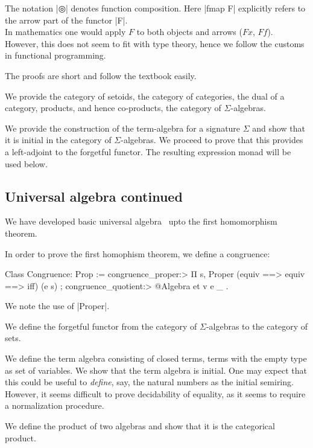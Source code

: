 \documentclass[a4paper,10pt, runningheads]{llncs}
\begin{document}
The notation |◎| denotes function composition.
Here |fmap F| explicitly refers to the arrow part of the functor |F|.\\
In mathematics one would apply $F$ to both objects and arrows ($F x$, $F f$). However, this does
not seem to fit with type theory, hence we follow the customs in functional programming.

The proofs are short and follow the textbook easily.

We provide the category of setoids, the category of categories, the dual of a category, products,
and hence co-products, the category of $\Sigma$-algebras.

We provide the construction of the term-algebra for a signature $\Sigma$ and show that it is
initial in the category of $\Sigma$-algebras. We proceed to prove that this provides a left-adjoint
to the forgetful functor. The resulting expression monad will be used below.

\subsection{Universal algebra continued}\label{univ2}

We have developed basic universal algebra~\cite{meinke1993universal} upto the first homomorphism
theorem.~

In order to prove the first homophism theorem, we define a congruence:
\begin{code}
Class Congruence: Prop :=
    { congruence_proper:> Π s, Proper (equiv ==> equiv ==> iff) (e s)
    ; congruence_quotient:> @Algebra et v e _
    }.
\end{code}
We note the use of |Proper|.

We define the forgetful functor from the category of $\Sigma$-algebras to the category of sets.

We define the term algebra consisting of closed terms, terms with the empty type as set of
variables. %
We show that the term algebra is initial. One may expect that this could be useful to
\emph{define}, say, the natural numbers as the initial semiring. However, it seems difficult to
prove decidability of equality, as it seems to require a normalization procedure.

We define the product of two algebras and show that it is the categorical product.
\end{document}
